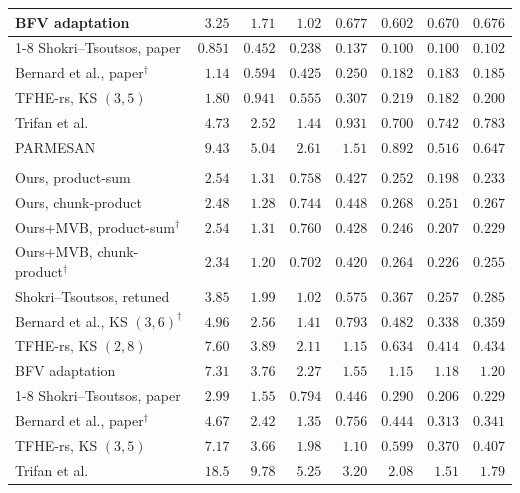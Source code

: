 \begin{table}[p]
\begin{tabular}{@{}lrrrrrrr@{}}
BFV adaptation & $3.25$ & $1.71$ & $1.02$ & $0.677$ & $0.602$ & $0.670$ & $0.676$ \\
\cmidrule(l){1-8}
Shokri--Tsoutsos, paper & $0.851$ & $0.452$ & $0.238$ & $0.137$ & $0.100$ & $0.100$ & $0.102$ \\
Bernard et al., paper$^\dagger$ & $1.14$ & $0.594$ & $0.425$ & $0.250$ & $0.182$ & $0.183$ & $0.185$ \\
TFHE-rs, KS $(3,5)$ & $1.80$ & $0.941$ & $0.555$ & $0.307$ & $0.219$ & $0.182$ & $0.200$ \\
Trifan et al. & $4.73$ & $2.52$ & $1.44$ & $0.931$ & $0.700$ & $0.742$ & $0.783$ \\
PARMESAN & $9.43$ & $5.04$ & $2.61$ & $1.51$ & $0.892$ & $0.516$ & $0.647$ \\
\midrule[0.8pt]
\rowcolor{black!8}\multicolumn{8}{@{}l}{\textbf{$W=32$}} \\
\midrule
Ours, product-sum & $2.54$ & $1.31$ & $0.758$ & $0.427$ & $0.252$ & $\mathbf{0.198}$ & $0.233$ \\
Ours, chunk-product & $2.48$ & $1.28$ & $0.744$ & $0.448$ & $0.268$ & $0.251$ & $0.267$ \\
Ours+MVB, product-sum$^\dagger$ & $2.54$ & $1.31$ & $0.760$ & $0.428$ & $\mathbf{0.246}$ & $0.207$ & $\mathbf{0.229}$ \\
Ours+MVB, chunk-product$^\dagger$ & $\mathbf{2.34}$ & $\mathbf{1.20}$ & $\mathbf{0.702}$ & $\mathbf{0.420}$ & $0.264$ & $0.226$ & $0.255$ \\
Shokri--Tsoutsos, retuned & $3.85$ & $1.99$ & $1.02$ & $0.575$ & $0.367$ & $0.257$ & $0.285$ \\
Bernard et al., KS $(3,6)^\dagger$ & $4.96$ & $2.56$ & $1.41$ & $0.793$ & $0.482$ & $0.338$ & $0.359$ \\
TFHE-rs, KS $(2,8)$ & $7.60$ & $3.89$ & $2.11$ & $1.15$ & $0.634$ & $0.414$ & $0.434$ \\
BFV adaptation & $7.31$ & $3.76$ & $2.27$ & $1.55$ & $1.15$ & $1.18$ & $1.20$ \\
\cmidrule(l){1-8}
Shokri--Tsoutsos, paper & $2.99$ & $1.55$ & $0.794$ & $0.446$ & $0.290$ & $0.206$ & $0.229$ \\
Bernard et al., paper$^\dagger$ & $4.67$ & $2.42$ & $1.35$ & $0.756$ & $0.444$ & $0.313$ & $0.341$ \\
TFHE-rs, KS $(3,5)$ & $7.17$ & $3.66$ & $1.98$ & $1.10$ & $0.599$ & $0.370$ & $0.407$ \\
Trifan et al. & $18.5$ & $9.78$ & $5.25$ & $3.20$ & $2.08$ & $1.51$ & $1.79$ \\

\end{tabular}
\end{table}

